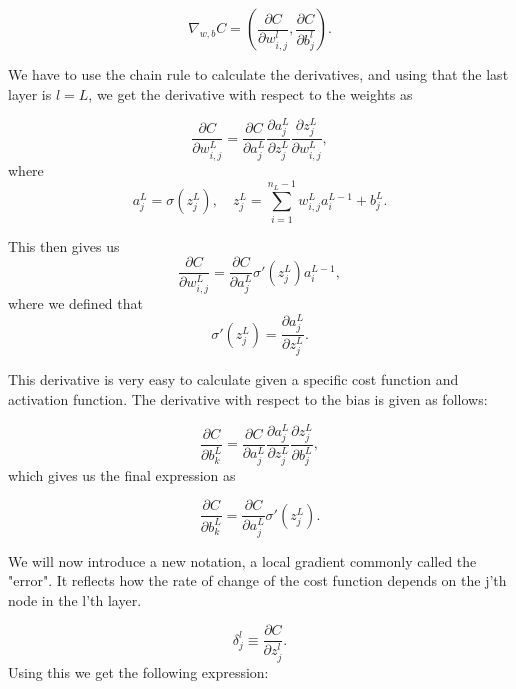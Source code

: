 \begin{equation*}
    \nabla_{w, b}C = \left(\frac{\partial C}{\partial w_{i,j}^l}, \frac{\partial C}{\partial b_j^l}\right).
\end{equation*}

We have to use the chain rule to calculate the derivatives, and using that the last layer is $l=L$, we get the derivative with respect to the weights as 

\begin{equation*}
    \frac{\partial C}{\partial w_{i,j}^L} = \frac{\partial C}{\partial a_j^L}\frac{\partial a_j^L}{\partial z_j^L}\frac{\partial z_j^L}{\partial w_{i,j}^L},
\end{equation*}
where 
\begin{equation*}
    a_j^L = \sigma(z_j^L), \quad z_j^L = \sum_{i=1}^{n_L-1} w_{i,j}^La_i^{L-1} + b_j^L.
\end{equation*}

This then gives us 
\begin{equation*}
    \frac{\partial C}{\partial w_{i,j}^L} = \frac{\partial C}{\partial a_j^L}\sigma'(z_j^L)a_i^{L-1},
\end{equation*}
where we defined that 
\begin{equation}\label{eq:sigma_der}
    \sigma'(z_j^L) = \frac{\partial a_j^L}{\partial z_j^L}.
\end{equation}

This derivative is very easy to calculate given a specific cost function and activation function. The derivative with respect to the bias is given as follows:

\begin{equation*}
    \frac{\partial C}{\partial b_k^L} = \frac{\partial C}{\partial a_j^L}\frac{\partial a_j^L}{\partial z_j^L}\frac{\partial z_j^L}{\partial b_{j}^L},
\end{equation*}
which gives us the final expression as 

\begin{equation*}
    \frac{\partial C}{\partial b_k^L} = \frac{\partial C}{\partial a_j^L}\sigma'(z_j^L). 
\end{equation*}

We will now introduce a new notation, a local gradient commonly called the "error". It reflects how the rate of change of the cost function depends on the j'th node in the l'th layer.

\begin{equation*}
    \delta_j^l \equiv \frac{\partial C}{\partial z_j^l}.  
\end{equation*}
Using this we get the following expression:

